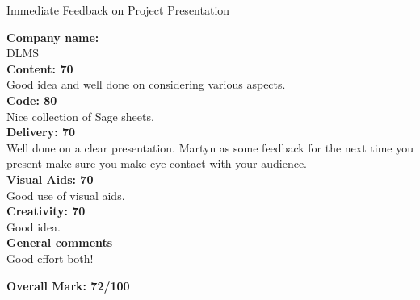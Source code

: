 \documentclass{article}
\begin{document}
\begin{center}
\Huge{Immediate Feedback on Project Presentation}\\
\end{center}


\normalsize
\textbf{Company name:}\\

DLMS \\

\textbf{Content: 70}\\

Good idea and well done on considering various aspects.\\

\textbf{Code: 80}\\

Nice collection of Sage sheets.\\

\textbf{Delivery: 70}\\

Well done on a clear presentation.
Martyn as some feedback for the next time you present make sure you make eye contact with your audience.\\

\textbf{Visual Aids: 70}\\

Good use of visual aids.\\

\textbf{Creativity: 70}\\

Good idea.\\

\textbf{General comments}\\

Good effort both!

\textbf{Overall Mark: 72/100}
\end{document}
